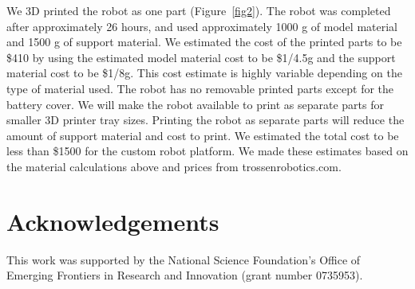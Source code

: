 \documentclass[letterpaper]{article}
\begin{document}
We 3D printed the robot as one part (Figure~\ref{fig2}). The robot was
completed after approximately 26 hours, and used approximately 1000 g
of model material and 1500 g of support material. We estimated the
cost of the printed parts to be \$410 by using the estimated model
material cost to be \$1/4.5g and the support material cost to be
\$1/8g. This cost estimate is highly variable depending on the type of
material used. The robot has no removable printed parts except for the
battery cover. We will make the robot available to print as separate
parts for smaller 3D printer tray sizes. Printing the robot as
separate parts will reduce the amount of support material and cost to
print. We estimated the total cost to be less than \$1500 for the
custom robot platform. We made these estimates based on the material
calculations above and prices from trossenrobotics.com.

\begin{table}[h]
\vskip 0.25cm
\caption{Estimated total cost. A specific parts list is on our website \citep{WEB}.}
\end{table}



\section{Acknowledgements}

This work was supported by the National Science Foundation's Office of
Emerging Frontiers in Research and Innovation (grant number 0735953).


\footnotesize


\end{document}
